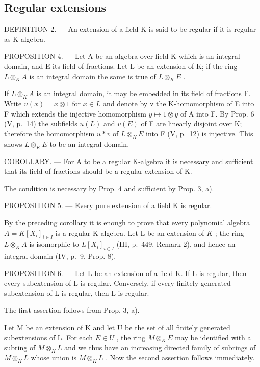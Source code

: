 \subsection{Regular extensions}

DEFINITION 2. --- An extension of a field K is said to be regular if it is regular as K-algebra.

PROPOSITION 4. --- Let A be an algebra over field K which is an integral domain, and E its field of fractions. Let L be an extension of K; if the ring \(L \otimes_{K} A\) is an integral domain the same is true of \(L \otimes_{K} E\) .

If \(L \otimes_{K} A\) is an integral domain, it may be embedded in its field of fractions F. Write \(u(x) = x \otimes 1\) for \(x \in L\) and denote by v the K-homomorphism of E into F which extends the injective homomorphism \(y \mapsto 1 \otimes y\) of A into F. By Prop. 6 (V, p.~14) the subfields \(u(L)\) and \(v(E)\) of F are linearly disjoint over K; therefore the homomorphism \(u * v\) of \(L \otimes_{K} E\) into F (V, p.~12) is injective. This shows \(L \otimes_{K} E\) to be an integral domain.

COROLLARY. --- For A to be a regular K-algebra it is necessary and sufficient that its field of fractions should be a regular extension of K.

The condition is necessary by Prop. 4 and sufficient by Prop. 3, a).

PROPOSITION 5. --- Every pure extension of a field K is regular.

By the preceding corollary it is enough to prove that every polynomial algebra \(A = K[X_{i}]_{i \in I}\) is a regular K-algebra. Let L be an extension of \(K\) ; the ring \(L \otimes_{K} A\) is isomorphic to \(L[X_{i}]_{i \in I}\) (III, p.~449, Remark 2), and hence an integral domain (IV, p.~9, Prop. 8).

PROPOSITION 6. --- Let L be an extension of a field K. If L is regular, then every subextension of L is regular. Conversely, if every finitely generated subextension of L is regular, then L is regular.

The first assertion follows from Prop. 3, a).

Let M be an extension of K and let U be the set of all finitely generated subextensions of L. For each \(E \in U\) , the ring \(M \otimes_{K} E\) may be identified with a subring of \(M \otimes_{K} L\) and we thus have an increasing directed family of subrings of \(M \otimes_{K} L\) whose union is \(M \otimes_{K} L\) . Now the second assertion follows immediately.

